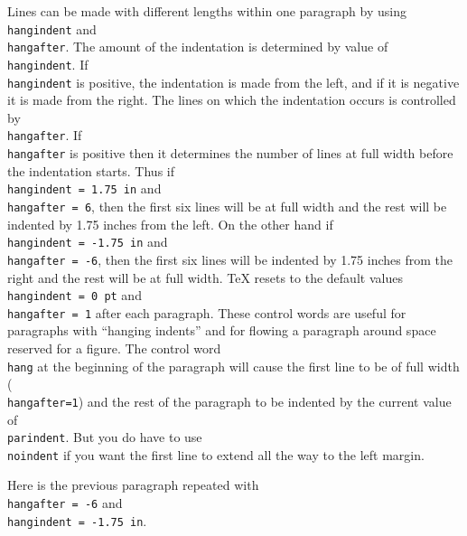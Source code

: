 \def\hangparagraph{ Lines can be made with different lengths 
within one paragraph by using {\tt \\hangindent} and {\tt 
\\hangafter}.  The amount of the indentation is determined by value 
of {\tt \\hangindent}. If {\tt \\hangindent} is positive, the 
indentation is made from the left, and if it is negative it is 
made from the right. The lines on which the indentation occurs is 
controlled by {\tt \\hangafter}.  If {\tt \\hangafter} is 
positive then it determines the number of lines at full width 
before the indentation starts.  Thus if {\tt \\hangindent = 1.75 
in} and {\tt \\hangafter = 6}, then the first six lines will be 
at full width and the rest will be indented by 1.75 inches from 
the left. On the other hand if {\tt \\hangindent = \hbox{-1.75} 
in} and {\tt \\hangafter = -6}, then the first six lines will be 
indented by 1.75 inches from the right and the rest will be at 
full width. \TeX{} resets to the default values {\tt \\hangindent 
= 0 pt} and {\tt \\hangafter = 1} after each paragraph. These 
control words are useful for paragraphs with ``hanging indents'' 
and for flowing a paragraph around space reserved for a figure. 
\TeXref{355}The control word {\tt \\hang} at the beginning of the 
paragraph will cause the first line to be of full width ({\tt 
\\hangafter=1}) and the rest of the paragraph to be indented by 
the current value of {\tt \\parindent}. But you do have to use 
{\tt \\noindent} if you want the first line to extend all the way 
to the left margin. 
\par} 
 
 \hangindent=1.75in 
\hangparagraph 
{} 
 
Here is the previous paragraph repeated with {\tt \\hangafter = -6} 
and {\tt \\hangindent = -1.75 in}. 
 

